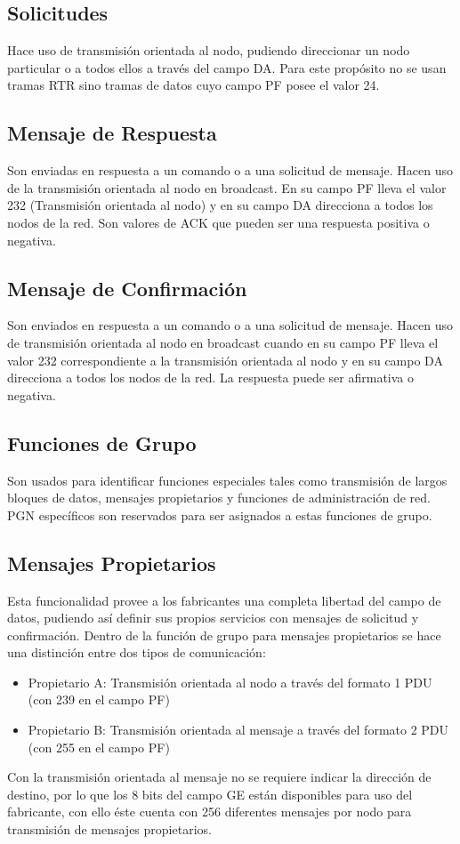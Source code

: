 \subsection{Solicitudes}
Hace uso de transmisión orientada al nodo, pudiendo direccionar un nodo particular o a todos ellos a través del campo DA. Para este propósito no se usan tramas RTR sino tramas de datos cuyo campo PF posee el valor 24.
\subsection{Mensaje de Respuesta}
Son enviadas en respuesta a un comando o a una solicitud de mensaje. Hacen uso de la transmisión orientada al nodo en broadcast. En su campo PF lleva el valor 232 (Transmisión orientada al nodo) y en su campo DA direcciona a todos los nodos de la red. Son valores de ACK que pueden ser una respuesta positiva o negativa.
\subsection{Mensaje de Confirmación}
Son enviados en respuesta a un comando o a una solicitud de mensaje. Hacen uso de transmisión orientada al nodo en broadcast cuando en su campo PF lleva el valor 232 correspondiente a la transmisión orientada al nodo y en su campo DA direcciona a todos los nodos de la red. La respuesta puede ser afirmativa o negativa.
\subsection{Funciones de Grupo}
Son usados para identificar funciones especiales tales como transmisión de largos bloques de datos, mensajes propietarios y funciones de administración de red. PGN específicos son reservados para ser asignados a estas funciones de grupo.
\subsection{Mensajes Propietarios}
Esta funcionalidad provee a los fabricantes una completa libertad del campo de datos, pudiendo así definir sus propios servicios con mensajes de solicitud y confirmación. Dentro de la función de grupo para mensajes propietarios se hace una distinción entre dos tipos de comunicación:
\begin{itemize}
\item Propietario A: Transmisión orientada al nodo a través del formato 1 PDU (con 239 en el campo PF)
\item Propietario B: Transmisión orientada al mensaje a través del formato 2 PDU (con 255 en el campo PF)
\end{itemize}
Con la transmisión orientada al mensaje no se requiere indicar la dirección de destino, por lo que los 8 bits del campo GE están disponibles para uso del fabricante, con ello éste cuenta con 256 diferentes mensajes por nodo para transmisión de mensajes propietarios.

